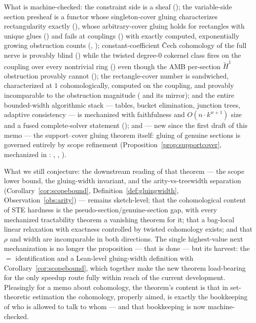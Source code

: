 \documentclass[11pt]{article}
\newcommand{\rectrho}{\rho}
\newcommand{\Hech}{\check H}
\begin{document}
What is machine-checked: the constraint side is a sheaf
(); the variable-side section
presheaf is a functor whose singleton-cover gluing characterizes
rectangularity exactly (), whose
arbitrary-cover gluing holds for rectangles with unique glues
() and fails at couplings
() with exactly computed,
exponentially growing obstruction counts
(, );
constant-coefficient \v{C}ech cohomology of the full nerve is
provably blind () while the twisted
degree-$0$ cokernel class fires on the coupling over every nontrivial
ring () even though the AMB
per-section $\Hech^1$ obstruction provably cannot
(); the rectangle-cover number is
sandwiched, characterized at $1$ cohomologically, computed on the
coupling, and provably incomparable to the obstruction magnitude
( and its
mirror); and the entire bounded-width algorithmic stack --- tables,
bucket elimination, junction trees, adaptive consistency --- is
mechanized with faithfulness and $O(n \cdot k^{w+1})$ size and a
fused complete-solver statement
(); and --- new since the
first draft of this memo --- the support--cover gluing theorem
itself: gluing of genuine sections is governed entirely by scope
refinement (Proposition~\ref{prop:supportcover}, mechanized in
:
,
,
).

What we still conjecture: the downstream reading of that theorem ---
the scope lower bound, the gluing-width invariant, and the
arity-vs-treewidth separation
(Corollary~\ref{cor:scopebound},
Definition~\ref{def:gluingwidth},
Observation~\ref{obs:arity}) --- remains sketch-level; that the
cohomological content of STE hardness is the
pseudo-section/genuine-section gap, with every mechanized
tractability theorem a vanishing theorem for it; that a bag-local
linear relaxation with exactness controlled by twisted cohomology
exists; and that $\rectrho$ and width are incomparable in both
directions.  The single highest-value next mechanization is no longer
the proposition --- that is done --- but its harvest: the
 $=$  identification and a Lean-level
gluing-width definition with Corollary~\ref{cor:scopebound}, which
together make the new theorem load-bearing for the only speedup route
fully within reach of the current development.  Pleasingly for a memo
about cohomology, the theorem's content is that in set-theoretic
estimation the cohomology, properly aimed, is exactly the bookkeeping
of who is allowed to talk to whom --- and that bookkeeping is now
machine-checked.



\end{document}
